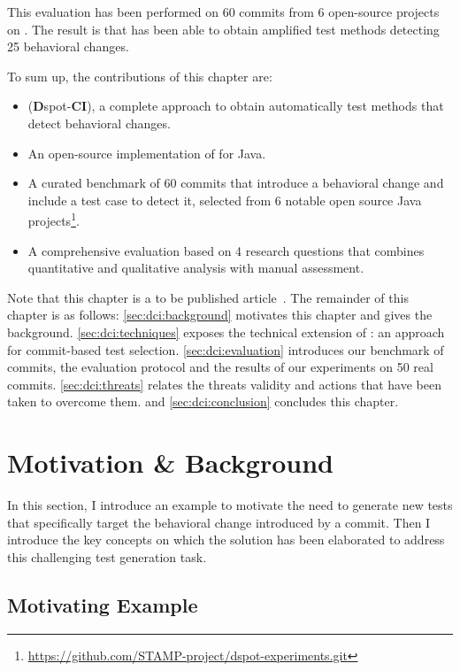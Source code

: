 This evaluation has been performed on 60 commits from 6 open-source projects on \gh.
The result is that \DCI has been able to obtain amplified test methods detecting 25 behavioral changes.

To sum up, the contributions of this chapter are:
\begin{itemize}
	\item \DCI (\textbf{D}spot-\textbf{CI}), a complete approach to obtain automatically test methods that detect behavioral changes.
	\item An open-source implementation of \DCI for Java.
	\item A curated benchmark of 60 commits that introduce a behavioral change and include a test case to detect it, selected from 6 notable open source Java projects\footnote{\url{https://github.com/STAMP-project/dspot-experiments.git}}.
	\item A comprehensive evaluation based on 4 research questions that combines quantitative and qualitative analysis with manual assessment.
\end{itemize}

Note that this chapter is a to be published article~\cite{DBLP:journals/corr/abs-1902-08482}.
The remainder of this chapter is as follows:
\autoref{sec:dci:background} motivates this chapter and gives the background.
\autoref{sec:dci:techniques} exposes the technical extension of \dspot: an approach for commit-based test selection. 
\autoref{sec:dci:evaluation} introduces our benchmark of commits, the evaluation protocol and the results of our experiments on 50 real commits. 
\autoref{sec:dci:threats} relates the threats validity and actions that have been taken to overcome them. 
and \autoref{sec:dci:conclusion} concludes this chapter.

\section{Motivation \& Background}
\label{sec:dci:background}

In this section, I introduce an example to motivate the need to generate new tests that specifically target the behavioral change introduced by a commit.
Then I introduce the key concepts on which the solution has been elaborated to address this challenging test generation task.

\subsection{Motivating Example}
\label{subsec:dci:background:example}

